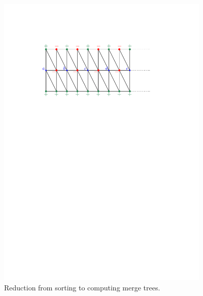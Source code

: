 \documentclass[A4paper,11pt]{article}
\begin{document}
\begin{figure}[h]
\begin{center}
\includegraphics[width=4.0in]{lowerBound}
\end{center}
\vspace{-.2in}
\caption{Reduction from sorting to computing merge trees.}
\end{figure}
























%
%
\end{document}
